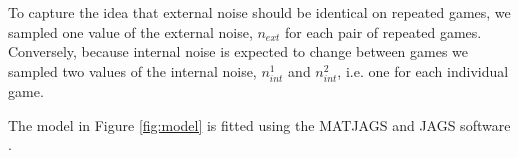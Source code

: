 \documentclass[12pt]{article}
\begin{document}
	To capture the idea that external noise should be identical on repeated games, we sampled one value of the external noise, $n_{ext}$ for each pair of repeated games.  Conversely, because internal noise is expected to change between games we sampled two values of the internal noise, $n_{int}^1$ and $n_{int}^2$, i.e. one for each individual game.  
	
	The model in Figure \ref{fig:model} is fitted using the MATJAGS and JAGS software \citep{jags, matjags}.
	
	
	
	
	
\end{document}
